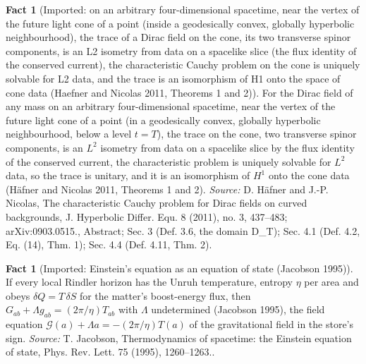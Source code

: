 \documentclass[11pt]{article}
\theoremstyle{definition}
\newtheorem{fact}[theorem]{Fact}
\theoremstyle{plain}
\begin{document}
\begin{fact}[Imported: on an arbitrary four-dimensional spacetime, near the vertex of the future light cone of a point (inside a geodesically convex, globally hyperbolic neighbourhood), the trace of a Dirac field on the cone, its two transverse spinor components, is an L2 isometry from data on a spacelike slice (the flux identity of the conserved current), the characteristic Cauchy problem on the cone is uniquely solvable for L2 data, and the trace is an isomorphism of H1 onto the space of cone data (Haefner and Nicolas 2011, Theorems 1 and 2)]\label{c:synthesis.imported-haefner-nicolas-dirac-characteristic-problem-on-light-cones-near-the-vertex}
For the Dirac field of any mass on an arbitrary four-dimensional spacetime, near the vertex of the future light cone of a point (in a geodesically convex, globally hyperbolic neighbourhood, below a level $t = T$), the trace on the cone, two transverse spinor components, is an $L^{2}$ isometry from data on a spacelike slice by the flux identity of the conserved current, the characteristic problem is uniquely solvable for $L^{2}$ data, so the trace is unitary, and it is an isomorphism of $H^{1}$ onto the cone data (Häfner and Nicolas 2011, Theorems 1 and 2).
\emph{Source:} D. Häfner and J.-P. Nicolas, The characteristic Cauchy problem for Dirac fields on curved backgrounds, J. Hyperbolic Differ. Equ. 8 (2011), no. 3, 437--483; arXiv:0903.0515., Abstract; Sec. 3 (Def. 3.6, the domain D\_T); Sec. 4.1 (Def. 4.2, Eq. (14), Thm. 1); Sec. 4.4 (Def. 4.11, Thm. 2).
\end{fact}

\begin{fact}[Imported: Einstein's equation as an equation of state (Jacobson 1995)]\label{c:synthesis.imported-jacobson-clausius-1995}
If every local Rindler horizon has the Unruh temperature, entropy $\eta$ per area and obeys $\delta Q = T\,\delta S$ for the matter's boost-energy flux, then $G_{ab} + \Lambda g_{ab} = (2\pi/\eta)T_{ab}$ with $\Lambda$ undetermined (Jacobson 1995), the field equation $\mathcal{G}(a) + \Lambda a = -(2\pi/\eta)T(a)$ of the gravitational field in the store's sign.
\emph{Source:} T. Jacobson, Thermodynamics of spacetime: the Einstein equation of state, Phys. Rev. Lett. 75 (1995), 1260--1263..
\end{fact}
\end{document}

